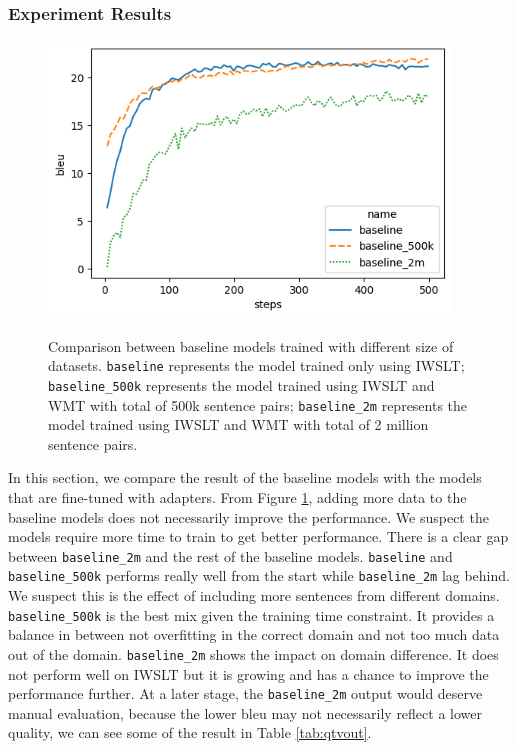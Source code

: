 \subsubsection{Experiment Results}
\begin{figure}[h]
    {\includegraphics[width=0.95\textwidth]{img/baseline.png}}
    \centering
    \caption{
        Comparison between baseline models trained with different size of datasets. \texttt{baseline} represents the model trained only using IWSLT; \texttt{baseline\_500k} represents the model trained using IWSLT and WMT with total of 500k sentence pairs; \texttt{baseline\_2m} represents the model trained using IWSLT and WMT with total of 2 million sentence pairs.}
    \label{img:basecomp}
\end{figure}

In this section, we compare the result of the baseline models with the models that are fine-tuned with adapters. From Figure \ref{img:basecomp}, adding more data to the baseline models does not necessarily improve the performance. We suspect the models require more time to train to get better performance. There is a clear gap between \texttt{baseline\_2m} and the rest of the baseline models. \texttt{baseline} and \texttt{baseline\_500k} performs really well from the start while \texttt{baseline\_2m} lag behind. We suspect this is the effect of including more sentences from different domains. \texttt{baseline\_500k} is the best mix given the training time constraint. It provides a balance in between not overfitting in the correct domain and not too much data out of the domain. \texttt{baseline\_2m} shows the impact on domain difference. It does not perform well on IWSLT but it is growing and has a chance to improve the performance further. At a later stage, the \texttt{baseline\_2m} output would deserve manual evaluation, because the lower bleu may not necessarily reflect a lower quality, we can see some of the result in Table \ref{tab:qtvout}.

